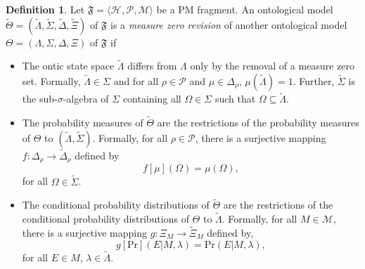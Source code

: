 \documentclass[DIV=calc,paper=a4,fontsize=11pt,twocolumn]{scrartcl} %
\theoremstyle{definition}
\newtheorem{definition}{Definition}[section]
\theoremstyle{plain}
\newcommand{\Hilb}[1][]{\ensuremath{\mathcal{H}_{#1}}}
\begin{document}
\begin{definition}
Let $\mathfrak{F} = \langle \Hilb, \mathcal{P}, \mathcal{M} \rangle$
be a PM fragment.  An ontological model $\tilde{\Theta} =
(\tilde{\Lambda}, \tilde{\Sigma}, \tilde{\Delta}, \tilde{\Xi})$ of
$\mathfrak{F}$ is a \emph{measure zero revision} of another
ontological model $\Theta = (\Lambda, \Sigma, \Delta, \Xi)$ of
$\mathfrak{F}$ if
\begin{itemize}
\item The ontic state space $\tilde{\Lambda}$ differs from $\Lambda$
only by the removal of a measure zero set.  Formally,
$\tilde{\Lambda} \in \Sigma$ and for all $\rho \in \mathcal{P}$
and $\mu \in \Delta_{\rho}$, $\mu(\tilde{\Lambda}) = 1$.  Further,
$\tilde{\Sigma}$ is the sub-$\sigma$-algebra of $\Sigma$
containing all $\Omega \in \Sigma$ such that $\Omega \subseteq
\tilde{\Lambda}$.
\item The probability measures of $\tilde{\Theta}$ are the restrictions
of the probability measures of $\Theta$ to $(\tilde{\Lambda},
\tilde{\Sigma})$.  Formally, for all $\rho \in \mathcal{P}$, there
is a surjective mapping $f:\Delta_{\rho} \rightarrow
\tilde{\Delta}_{\rho}$ defined by
\begin{equation}
f[\mu](\Omega) = \mu(\Omega),
\end{equation}
for all $\Omega \in \tilde{\Sigma}$.
\item The conditional probability distributions of $\tilde{\Theta}$
are the restrictions of the conditional probability distributions
of $\Theta$ to $\tilde{\Lambda}$.  Formally, for all $M \in
\mathcal{M}$, there is a surjective mapping $g:\Xi_M \rightarrow
\tilde{\Xi}_M$ defined by,
\begin{equation}
g[\text{Pr}](E|M,\lambda) = \text{Pr}(E|M,\lambda),
\end{equation}
for all $E \in M$, $\lambda \in \tilde{\Lambda}$.
\end{itemize}
\end{definition}
\end{document}
